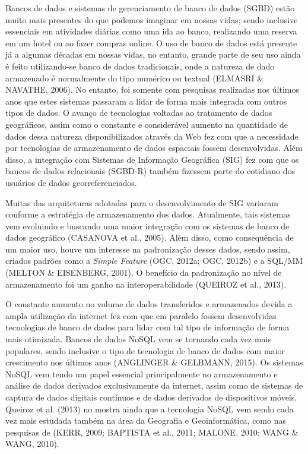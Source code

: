 		Bancos de dados e sistemas de gerenciamento de banco de dados (SGBD) estão muito mais presentes do que podemos imaginar em nossas vidas; sendo inclusive essenciais em atividades diárias como uma ida ao banco, realizando uma reserva em um hotel ou ao fazer compras online. O uso de banco de dados está presente já a algumas décadas em nossas vidas, no entanto, grande parte de seu uso ainda é feito utilizando-se banco de dados tradicionais, onde a natureza de dado armazenado é normalmente do tipo numérico ou textual (ELMASRI \& NAVATHE, 2006). No entanto, foi somente com pesquisas realizadas nos últimos anos que estes sistemas passaram a lidar de forma mais integrada com outros tipos de dados. O avanço de tecnologias voltadas ao tratamento de dados geográficos, assim como o constante e considerável aumento na quantidade de dados dessa natureza disponibilizados através da Web fez com que a necessidade por tecnologias de armazenamento de dados espaciais fossem desenvolvidas. Além disso, a integração com Sistemas de Informação Geográfica (SIG) fez com que os bancos de dados relacionais (SGBD-R) também fizessem parte do cotidiano dos usuários de dados georreferenciados.
		
		Muitas das arquiteturas adotadas para o desenvolvimento de SIG variaram conforme a estratégia de armazenamento dos dados. Atualmente, tais sistemas vem evoluindo e buscando uma maior integração com os sistemas de banco de dados geográfico (CASANOVA et al., 2005). Além disso, como consequência de um maior uso, houve um interesse na padronização desses dados, sendo assim, criados padrões como a \textit{Simple Feature} (OGC, 2012a; OGC, 2012b) e a SQL/MM (MELTON \& EISENBERG, 2001). O benefício da padronização no nível de armazenamento foi um ganho na interoperabilidade (QUEIROZ et al., 2013).
		
		O constante aumento no volume de dados transferidos e armazenados devida a ampla utilização da internet fez com que em paralelo fossem desenvolvidas tecnologias de banco de dados para lidar com tal tipo de informação de forma mais otimizada. Bancos de dados NoSQL vem se tornando cada vez mais populares, sendo inclusive o tipo de tecnologia de banco de dados com maior crescimento nos últimos anos (ANGLINGER \& GELBMANN, 2015). Os sistemas NoSQL vem tendo um papel essencial principalmente no armazenamento e análise de dados derivados exclusivamente da internet, assim como de sistemas de captura de dados digitais contínuos e de dados derivados de dispositivos móveis. Queiroz et al. (2013) no mostra ainda que a tecnologia NoSQL vem sendo cada vez mais estudada também na área da Geografia e  Geoinformática, como nas pesquisas de (KERR, 2009; BAPTISTA et al., 2011; MALONE, 2010; WANG \& WANG, 2010).
		
